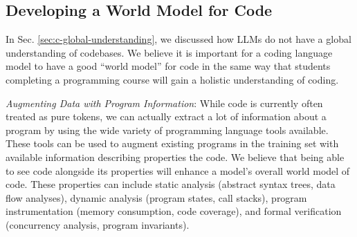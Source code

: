 \vspace{-0.2cm}

\subsection{Developing a World Model for Code}

\vspace{-0.1cm}



In Sec. \ref{sec:c-global-understanding}, we discussed how LLMs do not have a global understanding of codebases. We believe it is important for a coding language model to have a good ``world model'' for code in the same way that students completing a programming course will gain a holistic understanding of coding. 


\textit{Augmenting Data with Program Information}: While code is currently often treated as pure tokens, we can actually extract a lot of information about a program by using the wide variety of programming language tools available. These tools can be used to augment existing programs in the training set with available information describing properties the code. We believe that being able to see code alongside its properties will enhance a model's overall world model of code. These properties can include static analysis (abstract syntax trees, data flow analyses), dynamic analysis (program states, call stacks), program instrumentation (memory consumption, code coverage), and formal verification (concurrency analysis, program invariants).



